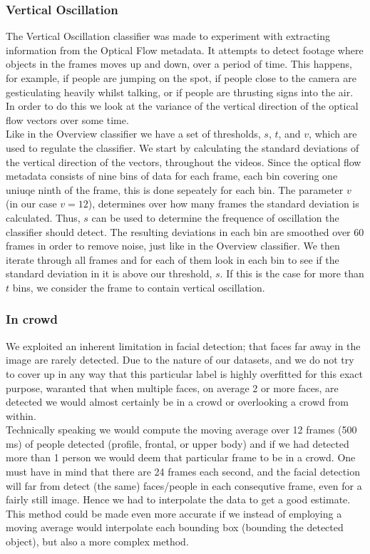 \subsubsection{Vertical Oscillation}
%
%
The Vertical Oscillation classifier was made to experiment with extracting information from the Optical Flow metadata. It attempts to detect footage where objects in the frames moves up and down, over a period of time. This happens, for example, if people are jumping on the spot, if people close to the camera are gesticulating heavily whilst talking, or if people are thrusting signs into the air. In order to do this we look at the variance of the vertical direction of the optical flow vectors over some time.\\
Like in the Overview classifier we have a set of thresholds, $s$, $t$, and $v$, which are used to regulate the classifier. We start by calculating the standard deviations of the vertical direction of the vectors, throughout the videos. Since the optical flow metadata consists of nine bins of data for each frame, each bin covering one uniuqe ninth of the frame, this is done sepeately for each bin. The parameter $v$ (in our case $v = 12$), determines over how many frames the standard deviation is calculated. Thus, $s$ can be used to determine the frequence of oscillation the classifier should detect. The resulting deviations in each bin are smoothed over 60 frames in order to remove noise, just like in the Overview classifier.
%
%
We then iterate through all frames and for each of them look in each bin to see if the standard deviation in it is above our threshold, $s$. If this is the case for more than $t$ bins, we consider the frame to contain vertical oscillation.
%
%
\subsubsection{In crowd}
%
We exploited an inherent limitation in facial detection; that faces far away in the image are rarely detected. Due to the nature of our datasets, and we do not try to cover up in any way that this particular label is highly overfitted for this exact purpose, waranted that when multiple faces,
%
%
on average 2 or more faces, are detected we would almost certainly be in a crowd or overlooking a crowd from within.\\
Technically speaking we would compute the moving average over 12 frames (500 ms) of people detected (profile, frontal, or upper body) and if we had detected more than 1 person we would deem that particular frame to be in a crowd.
%
%
One must have in mind that there are 24 frames each second, and the facial detection will far from detect (the same) faces/people in each consequtive frame, even for a fairly still image. Hence we had to interpolate the data to get a good estimate.\\
This method could be made even more accurate if we instead of employing a moving average would interpolate each bounding box (bounding the detected object), but also a more complex method.
%
